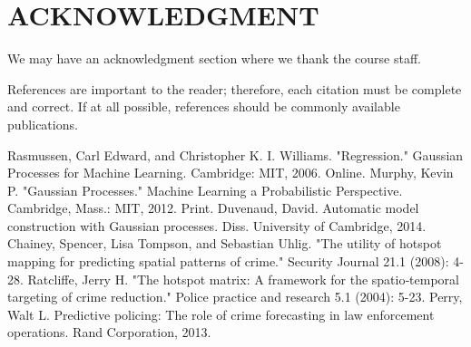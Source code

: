 \documentclass[letterpaper, 12 pt, conference]{ieeeconf}  %
\begin{document}
\section*{ACKNOWLEDGMENT}

We may have an acknowledgment section where we thank the course staff.




References are important to the reader; therefore, each citation must be complete and correct. If at all possible, references should be commonly available publications.



\begin{thebibliography}{99}

 Rasmussen, Carl Edward, and Christopher K. I. Williams. "Regression." Gaussian Processes for Machine Learning. Cambridge: MIT, 2006. Online.
 Murphy, Kevin P. "Gaussian Processes." Machine Learning a Probabilistic Perspective. Cambridge, Mass.: MIT, 2012. Print.
 Duvenaud, David. Automatic model construction with Gaussian processes. Diss. University of Cambridge, 2014.
 Chainey, Spencer, Lisa Tompson, and Sebastian Uhlig. "The utility of hotspot mapping for predicting spatial patterns of crime." Security Journal 21.1 (2008): 4-28.
 Ratcliffe, Jerry H. "The hotspot matrix: A framework for the spatio‐temporal targeting of crime reduction." Police practice and research 5.1 (2004): 5-23.
 Perry, Walt L. Predictive policing: The role of crime forecasting in law enforcement operations. Rand Corporation, 2013.

\end{thebibliography}
\end{document}
